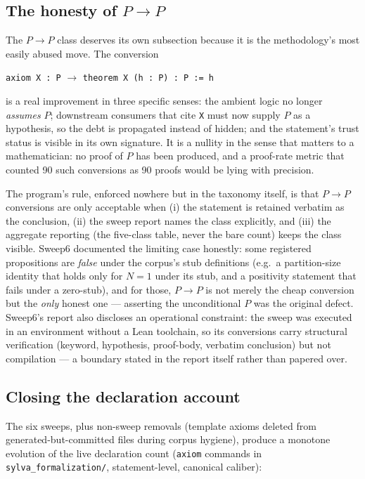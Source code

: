 \subsection{The honesty of \boldmath$P\!\to\!P$}
\label{sec:pp}
The $P\!\to\!P$ class deserves its own subsection because it is
the methodology's most easily abused move. The conversion
\begin{center}
\texttt{axiom X : P}
\quad$\longrightarrow$\quad
\texttt{theorem X (h : P) : P := h}
\end{center}
is a real improvement in three specific senses: the ambient logic
no longer \emph{assumes} $P$; downstream consumers that cite
\texttt{X} must now supply $P$ as a hypothesis, so the debt is
propagated instead of hidden; and the statement's trust status is
visible in its own signature. It is a nullity in the sense that
matters to a mathematician: no proof of $P$ has been produced, and
a proof-rate metric that counted 90 such conversions as 90 proofs
would be lying with precision.

The program's rule, enforced nowhere but in the taxonomy itself, is
that $P\!\to\!P$ conversions are only acceptable when (i) the
statement is retained verbatim as the conclusion, (ii) the sweep
report names the class explicitly, and (iii) the aggregate reporting
(the five-class table, never the bare count) keeps the class
visible. Sweep6 documented the limiting case honestly: some
registered propositions are \emph{false} under the corpus's stub
definitions (e.g.\ a partition-size identity that holds only for
$N=1$ under its stub, and a positivity statement that fails under a
zero-stub), and for those, $P\!\to\!P$ is not merely the cheap
conversion but the \emph{only} honest one --- asserting the
unconditional $P$ was the original defect. Sweep6's report also
discloses an operational constraint: the sweep was executed in an
environment without a Lean toolchain, so its conversions carry
structural verification (keyword, hypothesis, proof-body, verbatim
conclusion) but not compilation --- a boundary stated in the report
itself rather than papered over.

\subsection{Closing the declaration account}
\label{sec:evolution}
The six sweeps, plus non-sweep removals (template axioms deleted
from generated-but-committed files during corpus hygiene),
produce a monotone evolution of the live declaration count
(\texttt{axiom} commands in \texttt{sylva\_formalization/},
statement-level, canonical caliber):


